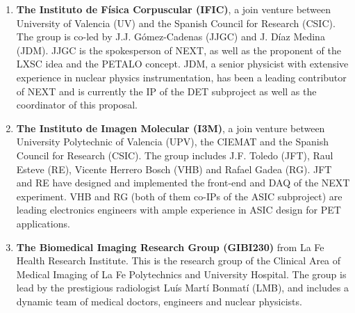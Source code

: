 \begin{enumerate}
\item {\bf The Instituto de Física Corpuscular (IFIC)}, a join venture between University of Valencia (UV) and the Spanish Council for Research (CSIC). The group is co-led by J.J. G\'omez-Cadenas (JJGC) and J. Díaz Medina (JDM).  JJGC is the spokesperson of NEXT, as well as the proponent of the LXSC idea and the PETALO concept. JDM, a senior physicist with extensive experience in nuclear physics instrumentation, has been a leading contributor of NEXT and is currently the IP of the DET subproject as well as the coordinator of this proposal. 
\item {\bf The Instituto de Imagen Molecular (I3M)}, a join venture between University Polytechnic of Valencia (UPV), the CIEMAT and the Spanish Council for Research (CSIC). The group includes J.F. Toledo (JFT), Raul Esteve (RE), Vicente Herrero Bosch (VHB) and Rafael Gadea (RG). JFT and RE have designed and implemented the front-end and DAQ of the NEXT experiment. VHB and RG (both of them co-IPs of the ASIC subproject) are leading electronics engineers with ample experience in ASIC design for PET applications.  
\item {\bf The  Biomedical Imaging Research Group (GIBI230)} from La Fe Health Research Institute. This is the research group of the Clinical Area of Medical Imaging of La Fe Polytechnics and University Hospital. The group is lead by the prestigious radiologist Luís Martí Bonmatí (LMB), and includes a dynamic team of medical doctors, engineers and nuclear physicists.  
\end{enumerate}


